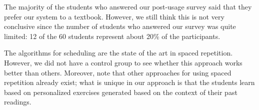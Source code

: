 The majority of the students who answered our post-usage survey said that  they prefer our system to a textbook. However, we still think this is not very conclusive since the number of students who answered our survey was quite limited: 12 of the 60 students represent about 20\% of the participants. 


The algorithms for scheduling are the state of the art in spaced repetition. However, we did not have a control group to see whether this approach works better than others. Moreover, note that other approaches for using spaced repetition already exist; what is unique in our approach is that the students learn based on personalized exercises generated based on the context of their past readings.






